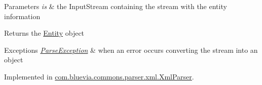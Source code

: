\begin{DoxyParams}{Parameters}
{\em is} & the InputStream containing the stream with the entity information \\
\hline
\end{DoxyParams}
\begin{DoxyReturn}{Returns}
the \hyperlink{interfacecom_1_1bluevia_1_1commons_1_1Entity}{Entity} object 
\end{DoxyReturn}

\begin{DoxyExceptions}{Exceptions}
{\em \hyperlink{classcom_1_1bluevia_1_1commons_1_1parser_1_1ParseException}{ParseException}} & when an error occurs converting the stream into an object \\
\hline
\end{DoxyExceptions}


Implemented in \hyperlink{classcom_1_1bluevia_1_1commons_1_1parser_1_1xml_1_1XmlParser_a40b67f6e8d70d841ee3a07e0d41c5050}{com.bluevia.commons.parser.xml.XmlParser}.


